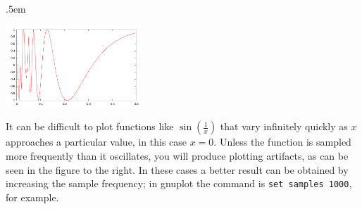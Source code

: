 \documentclass[12pt]{article}
\begin{document}
\openup.5em
\begin{floatingfigure}{2.25in}
\includegraphics[width=2in]{r2fig}
\end{floatingfigure}
It can be difficult to plot functions like $\sin(\frac{1}{x})$ that
vary infinitely quickly as $x$ approaches a particular value, in this
case $x=0$. Unless the function is sampled more frequently than it
oscillates, you will produce plotting artifacts, as can be seen in
the figure to the right. In
these cases a better result can be obtained by increasing the sample
frequency; in gnuplot the command is {\tt set samples 1000}, for
example.
\end{document}
